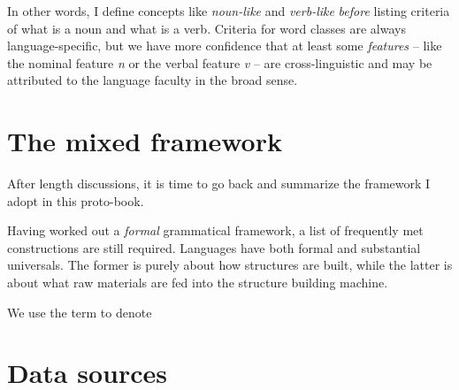 \documentclass[../main.tex]{subfiles}
\begin{document}
In other words, I define concepts like \emph{noun-like} and \emph{verb-like} \emph{before} listing criteria of 
what is a noun and what is a verb. Criteria for word classes are always language-specific, but we have more 
confidence that at least some \emph{features} -- like the nominal feature \textit{n} or the verbal feature 
\textit{v} -- are cross-linguistic and may be attributed to the language faculty in the broad sense. 

\section{The mixed framework}


After length discussions, it is time to go back and summarize the framework I adopt in this proto-book.

Having worked out a \emph{formal} grammatical framework, a list of frequently met constructions 
are still required. Languages have both formal and substantial universals. The former is purely about 
how structures are built, while the latter is about what raw materials are fed into the structure 
building machine. 


We use the term  to denote %

\section{Data sources}

\end{document}
